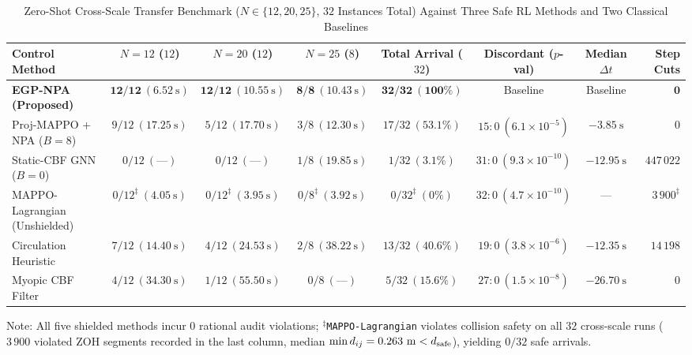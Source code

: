 \begin{table}[t]
 \centering\footnotesize
 \caption{Zero-Shot Cross-Scale Transfer Benchmark ($N\in\{12,20,25\}$, $32$ Instances Total) Against Three Safe RL Methods and Two Classical Baselines}\label{tab:e2}
 \begin{tabularx}{\textwidth}{@{}Xccccccr@{}}
 \toprule
 Control Method & $N=12$ ($12$) & $N=20$ ($12$) & $N=25$ ($8$) & Total Arrival ($32$) & Discordant ($p$-val) & Median $\Delta t$ & Step Cuts\\
 \midrule
 \textbf{EGP-NPA (Proposed)} & $\mathbf{12/12\ (6.52\ \mathrm s)}$ & $\mathbf{12/12\ (10.55\ \mathrm s)}$ & $\mathbf{8/8\ (10.43\ \mathrm s)}$ & $\mathbf{32/32\ (100\%)}$ & Baseline & Baseline & $\mathbf{0}$\\
 Proj-MAPPO + NPA \cite{wabersich2021,liu2026saferl} ($B=8$) & $9/12\ (17.25\ \mathrm s)$ & $5/12\ (17.70\ \mathrm s)$ & $3/8\ (12.30\ \mathrm s)$ & $17/32\ (53.1\%)$ & $15:0\ (6.1\times 10^{-5})$ & $-3.85\ \mathrm s$ & $0$\\
 Static-CBF GNN \cite{zhang2025gcbf,zhang2025dgppo} ($B=0$) & $0/12\ (\text{---})$ & $0/12\ (\text{---})$ & $1/8\ (19.85\ \mathrm s)$ & $1/32\ (3.1\%)$ & $31:0\ (9.3\times 10^{-10})$ & $-12.95\ \mathrm s$ & $447\,022$\\
 MAPPO-Lagrangian \cite{gu2023safe} (Unshielded) & $0/12^\ddagger\ (4.05\ \mathrm s)$ & $0/12^\ddagger\ (3.95\ \mathrm s)$ & $0/8^\ddagger\ (3.92\ \mathrm s)$ & $0/32^\ddagger\ (0\%)$ & $32:0\ (4.7\times 10^{-10})$ & --- & $3\,900^\ddagger$\\
 Circulation Heuristic \cite{goncalves2023circulation} & $7/12\ (14.40\ \mathrm s)$ & $4/12\ (24.53\ \mathrm s)$ & $2/8\ (38.22\ \mathrm s)$ & $13/32\ (40.6\%)$ & $19:0\ (3.8\times 10^{-6})$ & $-12.35\ \mathrm s$ & $14\,198$\\
 Myopic CBF Filter \cite{ames2017cbf,reis2021} & $4/12\ (34.30\ \mathrm s)$ & $1/12\ (55.50\ \mathrm s)$ & $0/8\ (\text{---})$ & $5/32\ (15.6\%)$ & $27:0\ (1.5\times 10^{-8})$ & $-26.70\ \mathrm s$ & $0$\\
 \bottomrule
 \end{tabularx}
 \vspace{1.5pt}
 \par\raggedright\scriptsize Note: All five shielded methods incur $0$ rational audit violations; $^\ddagger$\texttt{MAPPO-Lagrangian} violates collision safety on all $32$ cross-scale runs ($3\,900$ violated ZOH segments recorded in the last column, median $\min d_{ij}=0.263\ \mathrm m<d_{\mathrm{safe}}$), yielding $0/32$ safe arrivals.
\end{table}

